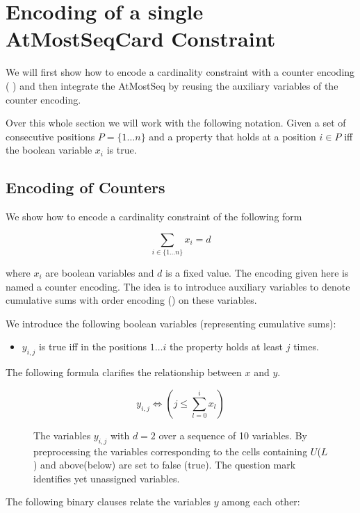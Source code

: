 \documentclass[]{llncs}
\newcommand{\TODO}[1]{ {\color{red}{#1} }}
\newcommand{\AtMostSeqCard}{AtMostSeqCard }
\begin{document}
\section{Encoding of a single \AtMostSeqCard Constraint}

We will first show how to encode a cardinality constraint with a counter
encoding (\TODO{First publication?}) and then integrate the AtMostSeq
by reusing the auxiliary variables of the counter encoding. 

Over this whole section we will work with the following notation. Given
a set of consecutive positions $P=\{1\ldots n\}$ and a property that
holds at a position $i\in P$ iff the boolean variable $x_i$ is true. 

\subsection{Encoding of Counters}

We show how to encode a cardinality constraint of the following form 

$$ \sum_{i\in \{1\ldots n\}} x_{i} = d $$

where $x_i$ are boolean variables and $d$ is a fixed value. The encoding
given here is named a counter encoding. The idea is to introduce
auxiliary variables to denote cumulative sums with order encoding
(\cite{Tamura09}) on these variables. 

We introduce the following boolean variables (representing cumulative sums): 

\begin{itemize}
    \item $y_{i,j}$ is true iff in the positions $1 \ldots i$ the
        property holds at least $j$ times.        
\end{itemize}

The following formula clarifies the relationship between $x$ and $y$.

$$ y_{i,j} \iff (j \leq \sum_{l=0}^{i} x_{l}) $$


\begin{figure}
\centering 
\caption{The variables $y_{i,j}$ with $d=2$ over a sequence of 10
variables. By preprocessing the variables corresponding to the cells
containing $U$($L$) and above(below) are set to false (true).  The
question mark identifies yet unassigned variables.}

\label{ex:1}
\end{figure}

The following binary clauses relate the variables $y$ among each other:
\end{document}
